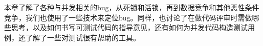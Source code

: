 
本章了解了各种与并发相关的bug，从死锁和活锁，再到数据竞争和其他恶性条件竞争，我们也使用了一些技术来定位bug。同样，也讨论了在做代码评审时需做哪些思考，以及如何书写可测试代码的指导意见，还有如何为并发代码构造测试用例，还了解了一些对测试很有帮助的工具。